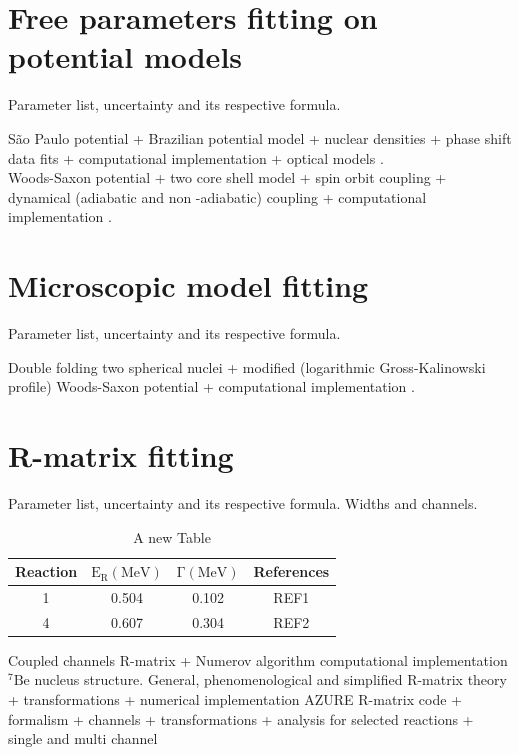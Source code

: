 \documentclass[openany]{book}
\begin{document}
\section{Free parameters fitting on potential models} \label{sec:potentialFitting}

Parameter list, uncertainty and its respective formula.

São Paulo potential + Brazilian potential model + nuclear densities + phase shift data fits + computational implementation + optical models \cite{chamon_carlson_gasques_2021}. \\

Woods-Saxon potential + two core shell model + spin orbit coupling +  dynamical (adiabatic and non -adiabatic) coupling  + computational implementation \cite{diaz-torres_2018} .

\section{Microscopic model fitting} \label{sec:microscopicFitting}

Parameter list, uncertainty and its respective formula.

Double folding two spherical nuclei + modified (logarithmic Gross-Kalinowski profile) Woods-Saxon potential + computational implementation \cite{gontchar_chushnyakova_2016}.

\section{R-matrix fitting} \label{sec:rmatrixFitting}

Parameter list, uncertainty and its respective formula. Widths and channels.


\begin{table}[H]
	\centering
	\begin{tabular}{|c|c|c|c|}
		\hline
		Reaction & $\mathrm{E_R(MeV)}$ &  $\mathrm{\Gamma(MeV)}$ & References  \\  \hline
		1 &  0.504 & 0.102  & REF1  \\
 		4 &  0.607 & 0.304 & REF2 \\
 		\hline
	\end{tabular}
	\caption[R-matrix table]{A new Table}
	\label{table:fitting_rmatrix}
\end{table}

Coupled channels R-matrix + Numerov algorithm computational implementation \cite{descouvemont_2016}
 $\mathrm{{}^{7}Be}$ nucleus structure. General, phenomenological and simplified R-matrix theory 
 + transformations + numerical implementation \cite{thompson_deboer_dimitriou_kunieda_pigni_arbanas_leeb_srdinko_hale_tamagno_et_2019}
AZURE R-matrix code + formalism + channels + transformations + analysis for selected reactions + single and multi channel 	\cite{azuma_uberseder_simpson_brune_costantini_deboer_gorres_heil_leblanc_ugalde_et_2010}
\end{document}

